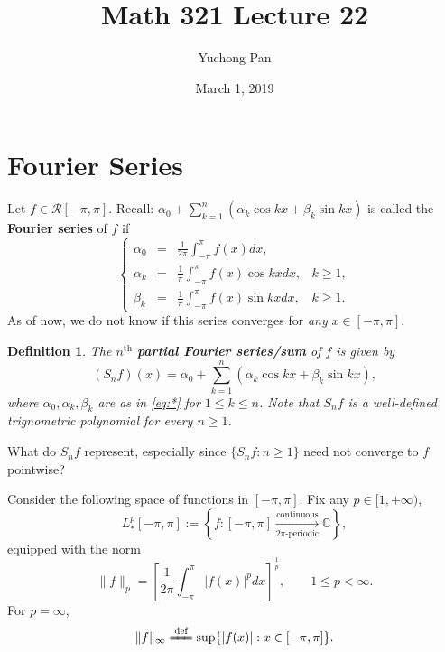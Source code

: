 \documentclass[letterpaper, reqno,11pt]{article}
\newcommand{\CC}{\mathbb{C}}
\begin{document}
\title{Math 321 Lecture 22}
\author{Yuchong Pan}
\date{March 1, 2019}
\newtheorem{thm}{Theorem}
\newtheorem{defn}{Definition}
\newtheorem*{remark}{Remark}
\newtheorem{claim}{Claim}
\newtheorem{cor}{Corollary}
\newtheorem{lemma}{Lemma}
\newtheorem{prop}{Proposition}
\newtheorem{fact}{Fact}
\maketitle
%

\section{Fourier Series}

Let $f \in \mathcal R[-\pi, \pi]$. Recall: $\alpha_0 + \sum_{k = 1}^n (\alpha_k \cos kx + \beta_k \sin kx)$ is called the {\bf Fourier series} of $f$ if
\begin{equation} \label{eq:*} \tag{*}
  \left\{
  \begin{array}{lclr}
    \alpha_0 &=& \frac{1}{2\pi} \int_{-\pi}^\pi f(x) dx, & \\
    \alpha_k &=& \frac{1}{\pi} \int_{-\pi}^\pi f(x) \cos kx dx, & k \geq 1, \\
    \beta_k &=& \frac{1}{\pi} \int_{-\pi}^\pi f(x) \sin kx dx, & k \geq 1.
  \end{array}
  \right.
\end{equation}
As of now, we do not know if this series converges for \emph{any} $x \in [-\pi, \pi]$.

\begin{defn}
  \normalfont The $n^\text{th}$ {\bf partial Fourier series/sum} of $f$ is given by
  \[ (S_n f)(x) = \alpha_0 + \sum_{k = 1}^n (\alpha_k \cos kx + \beta_k \sin kx), \]
  where $\alpha_0, \alpha_k, \beta_k$ are as in \eqref{eq:*} for $1 \leq k \leq n$. Note that $S_n f$ is a well-defined trignometric polynomial for every $n \geq 1$.
\end{defn}

 What do $S_n f$ represent, especially since $\{ S_n f : n \geq 1 \}$ need not converge to $f$ pointwise?

Consider the following space of functions in $[-\pi, \pi]$. Fix any $p \in [1, +\infty)$,
\[ L_*^p[-\pi, \pi] := \left\{ f : [-\pi, \pi] \xrightarrow[\text{$2\pi$-periodic}]{\text{continuous}} \CC \right\}, \]
equipped with the norm
\[ \lVert f \rVert_p = \left[\frac{1}{2\pi} \int_{-\pi}^\pi |f(x)|^p dx\right]^\frac{1}{p}, \qquad 1 \leq p < \infty. \]
For $p = \infty$,
\[ \lVert f \rVert_\infty \xlongequal{\text{def}} \sup \{ |f(x)| : x \in [-\pi, \pi] \}. \]
\end{document}
